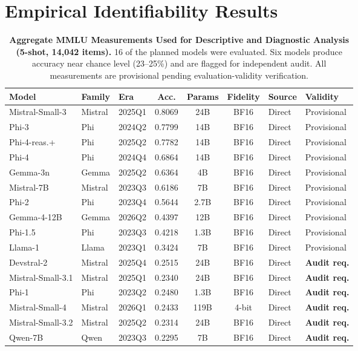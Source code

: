 \documentclass[11pt]{article}
\theoremstyle{definition}
\theoremstyle{plain}
\begin{document}
\section{Empirical Identifiability Results}
\label{sec:empirical_results}

\begin{table}[!htbp]
\caption{\textbf{Aggregate MMLU Measurements Used for Descriptive and Diagnostic Analysis (5-shot, 14,042 items).} 16 of the planned models were evaluated. Six models produce accuracy near chance level (23--25\%) and are flagged for independent audit. All measurements are provisional pending evaluation-validity verification.}
\label{tab:accuracy}
\centering
\footnotesize
\setlength{\tabcolsep}{3pt}
\begin{tabular}{|l|l|l|c|c|c|l|l|}
\hline
\textbf{Model} & \textbf{Family} & \textbf{Era} & \textbf{Acc.} & \textbf{Params} & \textbf{Fidelity} & \textbf{Source} & \textbf{Validity} \\
\hline
Mistral-Small-3 & Mistral & 2025Q1 & 0.8069 & 24B & BF16 & Direct & Provisional \\
\hline
Phi-3 & Phi & 2024Q2 & 0.7799 & 14B & BF16 & Direct & Provisional \\
\hline
Phi-4-reas.+ & Phi & 2025Q2 & 0.7782 & 14B & BF16 & Direct & Provisional \\
\hline
Phi-4 & Phi & 2024Q4 & 0.6864 & 14B & BF16 & Direct & Provisional \\
\hline
Gemma-3n & Gemma & 2025Q2 & 0.6364 & 4B & BF16 & Direct & Provisional \\
\hline
Mistral-7B & Mistral & 2023Q3 & 0.6186 & 7B & BF16 & Direct & Provisional \\
\hline
Phi-2 & Phi & 2023Q4 & 0.5644 & 2.7B & BF16 & Direct & Provisional \\
\hline
Gemma-4-12B & Gemma & 2026Q2 & 0.4397 & 12B & BF16 & Direct & Provisional \\
\hline
Phi-1.5 & Phi & 2023Q3 & 0.4218 & 1.3B & BF16 & Direct & Provisional \\
\hline
Llama-1 & Llama & 2023Q1 & 0.3424 & 7B & BF16 & Direct & Provisional \\
\hline
Devstral-2 & Mistral & 2025Q4 & 0.2515 & 24B & BF16 & Direct & \textbf{Audit req.} \\
\hline
Mistral-Small-3.1 & Mistral & 2025Q1 & 0.2340 & 24B & BF16 & Direct & \textbf{Audit req.} \\
\hline
Phi-1 & Phi & 2023Q2 & 0.2480 & 1.3B & BF16 & Direct & \textbf{Audit req.} \\
\hline
Mistral-Small-4 & Mistral & 2026Q1 & 0.2433 & 119B & 4-bit & Direct & \textbf{Audit req.} \\
\hline
Mistral-Small-3.2 & Mistral & 2025Q2 & 0.2314 & 24B & BF16 & Direct & \textbf{Audit req.} \\
\hline
Qwen-7B & Qwen & 2023Q3 & 0.2295 & 7B & BF16 & Direct & \textbf{Audit req.} \\
\hline
\end{tabular}
\end{table}
\end{document}
